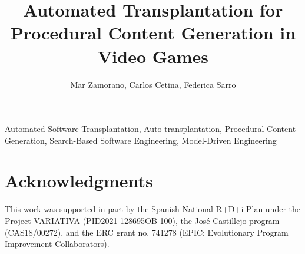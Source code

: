 \documentclass[lettersize,journal]{IEEEtran}
\title{Automated Transplantation for Procedural Content Generation in Video Games}
\author{Mar Zamorano, Carlos Cetina, Federica Sarro}
\begin{document}
\maketitle

\begin{abstract}

\end{abstract}

\begin{IEEEkeywords}
Automated Software Transplantation, Auto-transplantation, Procedural Content Generation, Search-Based Software Engineering, Model-Driven Engineering
\end{IEEEkeywords}











\section*{Acknowledgments}
This work was supported in part by the Spanish National R+D+i Plan under the Project VARIATIVA (PID2021-128695OB-100), the José Castillejo program (CAS18/00272), and the ERC grant no. 741278 (EPIC: Evolutionary Program Improvement Collaborators).



\end{document}

